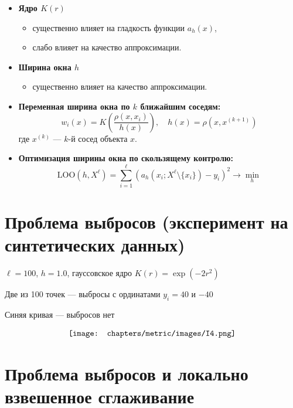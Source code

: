 \begin{itemize}
    \item \textbf{Ядро \(K(r)\)}
    \begin{itemize}
        \item существенно влияет на гладкость функции \( a_h(x) \),
        \item слабо влияет на качество аппроксимации.
    \end{itemize}
    \item \textbf{Ширина окна \(h\)}
    \begin{itemize}
        \item существенно влияет на качество аппроксимации.
    \end{itemize}
    \item \textbf{Переменная ширина окна по \(k\) ближайшим соседям:}
    \[
    w_i(x) = K\left( \frac{\rho(x, x_i)}{h(x)} \right), \quad h(x) = \rho(x, x^{(k+1)})
    \]
    где \(x^{(k)}\) — \(k\)-й сосед объекта \(x\).

    \item \textbf{Оптимизация ширины окна по скользящему контролю:}
    \[
    \text{LOO}(h, X^\ell) = \sum_{i=1}^\ell \left( a_h(x_i; X^\ell \setminus \{x_i\}) - y_i \right)^2 \to \min_h
    \]
\end{itemize}

\section*{Проблема выбросов (эксперимент на синтетических данных)}

\noindent
\(\ell = 100\), \(h = 1.0\), гауссовское ядро \(K(r) = \exp(-2r^2)\)

\vspace{0.5em}

{\color{red}Две из 100 точек — выбросы с ординатами \(y_i = 40\) и \(-40\)}

\vspace{0.5em}

{\color{blue}Синяя кривая — выбросов нет}

\begin{align*}
    \centering
    \texttt{[image: chapters/metric/images/I4.png]}
    \label{fig:kernel_triangle}
\end{align*}

\section*{Проблема выбросов и локально взвешенное сглаживание}

